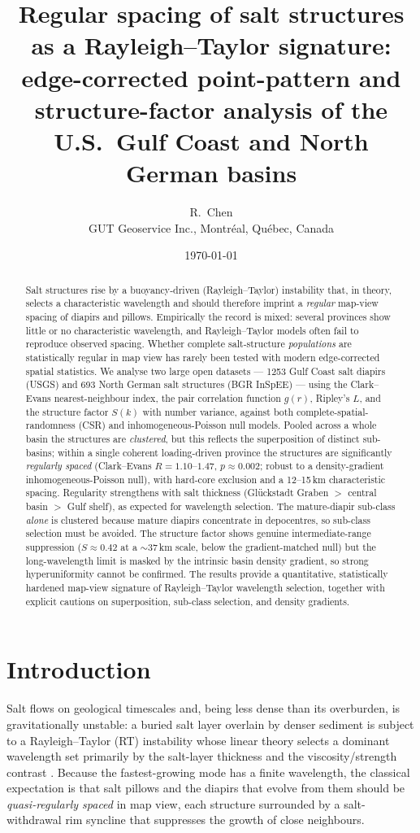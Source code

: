 \documentclass[11pt]{article}
\title{\bfseries Regular spacing of salt structures as a Rayleigh--Taylor signature:
edge-corrected point-pattern and structure-factor analysis of the U.S.\ Gulf Coast and North German basins}
\author{R.~Chen\\{\small GUT Geoservice Inc., Montr\'eal, Qu\'ebec, Canada}}
\date{\today}
\begin{document}
\maketitle

\begin{abstract}
\noindent
Salt structures rise by a buoyancy-driven (Rayleigh--Taylor) instability that, in theory, selects a
characteristic wavelength and should therefore imprint a \emph{regular} map-view spacing of diapirs and
pillows. Empirically the record is mixed: several provinces show little or no characteristic wavelength,
and Rayleigh--Taylor models often fail to reproduce observed spacing. Whether complete salt-structure
\emph{populations} are statistically regular in map view has rarely been tested with modern edge-corrected
spatial statistics. We analyse two large open datasets --- 1253 Gulf Coast salt diapirs (USGS) and 693
North German salt structures (BGR InSpEE) --- using the Clark--Evans nearest-neighbour index, the pair
correlation function $g(r)$, Ripley's $L$, and the structure factor $S(k)$ with number variance, against
both complete-spatial-randomness (CSR) and inhomogeneous-Poisson null models. Pooled across a whole basin
the structures are \emph{clustered}, but this reflects the superposition of distinct sub-basins; within a
single coherent loading-driven province the structures are significantly \emph{regularly spaced}
(Clark--Evans $R=1.10$--$1.47$, $p\approx0.002$; robust to a density-gradient inhomogeneous-Poisson null),
with hard-core exclusion and a 12--15\,km characteristic spacing. Regularity strengthens with salt
thickness (Gl\"uckstadt Graben $>$ central basin $>$ Gulf shelf), as expected for wavelength selection. The
mature-diapir sub-class \emph{alone} is clustered because mature diapirs concentrate in depocentres, so
sub-class selection must be avoided. The structure factor shows genuine intermediate-range suppression
($S\!\approx\!0.42$ at a $\sim$37\,km scale, below the gradient-matched null) but the long-wavelength limit
is masked by the intrinsic basin density gradient, so strong hyperuniformity cannot be confirmed. The
results provide a quantitative, statistically hardened map-view signature of Rayleigh--Taylor wavelength
selection, together with explicit cautions on superposition, sub-class selection, and density gradients.
\end{abstract}

\section{Introduction}
Salt flows on geological timescales and, being less dense than its overburden, is gravitationally unstable:
a buried salt layer overlain by denser sediment is subject to a Rayleigh--Taylor (RT) instability whose
linear theory selects a dominant wavelength set primarily by the salt-layer thickness and the
viscosity/strength contrast \citep{trusheim1960,hudec2007,fernandez2015}. Because the fastest-growing mode
has a finite wavelength, the classical expectation is that salt pillows and the diapirs that evolve from
them should be \emph{quasi-regularly spaced} in map view, each structure surrounded by a salt-withdrawal
rim syncline that suppresses the growth of close neighbours.
\end{document}
